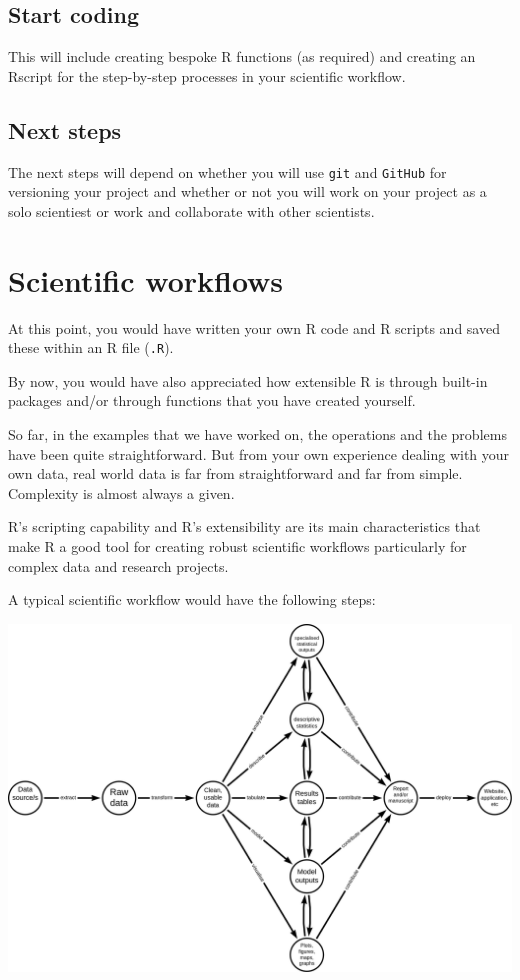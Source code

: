 \documentclass[
  12pt,
]{book}
\begin{document}
\hypertarget{start-coding}{%
\section{Start coding}\label{start-coding}}

This will include creating bespoke R functions (as required) and creating an Rscript for the step-by-step processes in your scientific workflow.

\hypertarget{next-steps}{%
\section{Next steps}\label{next-steps}}

The next steps will depend on whether you will use \texttt{git} and \texttt{GitHub} for versioning your project and whether or not you will work on your project as a solo scientiest or work and collaborate with other scientists.

\hypertarget{portable-reproducible}{%
\chapter{Scientific workflows}\label{portable-reproducible}}

At this point, you would have written your own R code and R scripts and saved these within an R file (\texttt{.R}).

By now, you would have also appreciated how extensible R is through built-in packages and/or through functions that you have created yourself.

So far, in the examples that we have worked on, the operations and the problems have been quite straightforward. But from your own experience dealing with your own data, real world data is far from straightforward and far from simple. Complexity is almost always a given.

R's scripting capability and R's extensibility are its main characteristics that make R a good tool for creating robust scientific workflows particularly for complex data and research projects.

A typical scientific workflow would have the following steps:

\begin{center}\includegraphics[width=21.96in]{images/scientific-workflow} \end{center}
\end{document}
